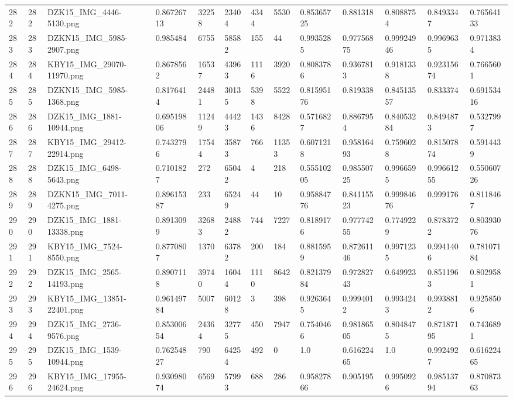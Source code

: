 \documentclass[11pt, a4paper, twoside]{report}
\begin{document}
\begin{longtable}[c]{@{}lllllllllllll@{}}
282 & 282 & DZK15\_IMG\_4446-5130.png & 0.86726713 & 32258 & 23404 & 4344 & 5530 & 0.85365725 & 0.881318 & 0.8088754 & 0.8493347 & 0.76564133 \\
283 & 283 & DZKN15\_IMG\_5985-2907.png & 0.985484 & 6755 & 58582 & 155 & 44 & 0.9935285 & 0.97756875 & 0.99924946 & 0.9969635 & 0.9713834 \\
284 & 284 & KBY15\_IMG\_29070-11970.png & 0.8678562 & 16537 & 43963 & 1116 & 3920 & 0.8083786 & 0.9367813 & 0.9181338 & 0.92315674 & 0.7665601 \\
285 & 285 & DZKN15\_IMG\_5985-1368.png & 0.8176414 & 24481 & 30135 & 5398 & 5522 & 0.81595176 & 0.819338 & 0.84513557 & 0.833374 & 0.69153416 \\
286 & 286 & DZK15\_IMG\_1881-10944.png & 0.69519806 & 11249 & 44423 & 1436 & 8428 & 0.5716827 & 0.8867954 & 0.84053284 & 0.8494873 & 0.5327997 \\
287 & 287 & KBY15\_IMG\_29412-22914.png & 0.7432796 & 17544 & 35873 & 766 & 11353 & 0.6071218 & 0.95816493 & 0.7596028 & 0.81507874 & 0.5914439 \\
288 & 288 & DZK15\_IMG\_6498-5643.png & 0.7101827 & 272 & 65042 & 4 & 218 & 0.55510205 & 0.98550725 & 0.9966595 & 0.99661255 & 0.55060726 \\
289 & 289 & DZKN15\_IMG\_7011-4275.png & 0.89615387 & 233 & 65249 & 44 & 10 & 0.95884776 & 0.84115523 & 0.99984676 & 0.999176 & 0.8118467 \\
290 & 290 & DZK15\_IMG\_1881-13338.png & 0.8913099 & 32683 & 24882 & 744 & 7227 & 0.8189176 & 0.97774255 & 0.7749229 & 0.8783722 & 0.80393076 \\
291 & 291 & KBY15\_IMG\_7524-8550.png & 0.8770807 & 1370 & 63782 & 200 & 184 & 0.8815959 & 0.87261146 & 0.9971235 & 0.9941406 & 0.78107184 \\
292 & 292 & DZK15\_IMG\_2565-14193.png & 0.8907118 & 39740 & 16044 & 1110 & 8642 & 0.82137984 & 0.97282743 & 0.649923 & 0.8511963 & 0.8029581 \\
293 & 293 & KBY15\_IMG\_13851-22401.png & 0.96149784 & 5007 & 60128 & 3 & 398 & 0.9263645 & 0.9994012 & 0.9934243 & 0.9938812 & 0.9258506 \\
294 & 294 & DZK15\_IMG\_2736-9576.png & 0.85300654 & 24364 & 32775 & 450 & 7947 & 0.7540466 & 0.98186505 & 0.8048475 & 0.87187195 & 0.7436891 \\
295 & 295 & DZK15\_IMG\_1539-10944.png & 0.76254827 & 790 & 64254 & 492 & 0 & 1.0 & 0.61622465 & 1.0 & 0.9924927 & 0.61622465 \\
296 & 296 & KBY15\_IMG\_17955-24624.png & 0.93098074 & 6569 & 57993 & 688 & 286 & 0.95827866 & 0.905195 & 0.9950926 & 0.98513794 & 0.87087363 \\

\end{longtable}
\end{document}
